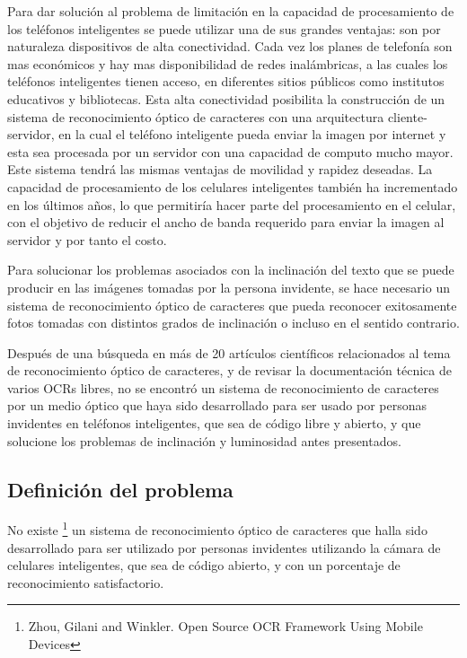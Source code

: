 \documentclass[a4paper, 11pt, oneside]{article}
\begin{document}
	Para dar solución al problema de limitación en la capacidad de procesamiento de los teléfonos inteligentes se puede utilizar una de sus grandes ventajas: son por naturaleza dispositivos de alta conectividad. Cada vez los planes de telefonía son mas económicos y hay mas disponibilidad de redes inalámbricas, a las cuales los teléfonos inteligentes tienen acceso, en diferentes sitios públicos como institutos educativos y bibliotecas. Esta alta conectividad posibilita la construcción de un sistema de reconocimiento óptico de caracteres con una arquitectura cliente-servidor, en la cual el teléfono inteligente pueda enviar la imagen por internet y esta sea procesada por un servidor con una capacidad de computo mucho mayor. Este sistema tendrá las mismas ventajas de movilidad y rapidez deseadas. La capacidad de procesamiento de los celulares inteligentes también ha incrementado en los últimos años, lo que permitiría hacer parte del procesamiento en el celular, con el objetivo de reducir el ancho de banda requerido para enviar la imagen al servidor y por tanto el costo.

	Para solucionar los problemas asociados con la inclinación del texto que se puede producir en las imágenes tomadas por la persona invidente, se hace necesario un sistema de reconocimiento óptico de caracteres que pueda reconocer exitosamente fotos tomadas con distintos grados de inclinación o incluso en el sentido contrario.

Después de una búsqueda en más de 20 artículos científicos relacionados al tema de reconocimiento óptico de caracteres, y de revisar la documentación técnica de varios OCRs libres, no se encontró un sistema de reconocimiento de caracteres por un medio óptico que haya sido desarrollado para ser usado por personas invidentes en teléfonos inteligentes, que sea de código libre y abierto, y que solucione los problemas de inclinación y luminosidad antes presentados. 	
	
	\subsection{Definición del problema}

	No existe \footnote{Zhou, Gilani and Winkler. Open Source OCR Framework Using Mobile Devices}
    un sistema de reconocimiento óptico de caracteres que halla sido desarrollado para ser utilizado 
    por personas invidentes utilizando la cámara de celulares inteligentes, que sea de código abierto, 
    y con un porcentaje de reconocimiento satisfactorio.
	
\end{document}
